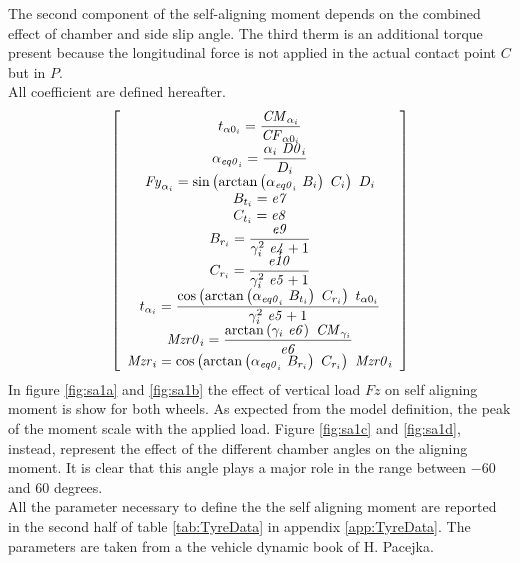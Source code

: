 The second component of the self-aligning moment depends on the combined effect of chamber and side slip angle. The third therm is an additional torque present because the longitudinal force is not applied in the actual contact point $C$ but in $P$.\cite{pacejka2012tire} \\
All coefficient are defined hereafter.
%
%
%
\begin{equation}
    \left[ \begin{array}{c} 
    \displaystyle t_{\alpha0_{i}} =\frac{{\it CM}_{\alpha_{i}}
    }{{\it CF}_{\alpha0_{i}} }\\ \displaystyle \alpha_{{\it eq0}_{i}}
    =\frac{\alpha_{i} ~{\it D0}_{i} }{D_{i} }\\ {\it Fy
   }_{\alpha_{i}} =\sin \left(\arctan \left(\alpha_{{\it eq0}_{i}} ~B_{i}
    \right)~C_{i} \right)~D_{i} \\ B_{t_{i}} ={\it e7} 
   \\ C_{t_{i}} ={\it e8} \\ \displaystyle B_{r_{i}
   } =\frac{{\it e9} }{\gamma_{i} ^{2}~{\it e4} +1}\\ \displaystyle C
   _{r_{i}} =\frac{{\it e10} }{\gamma_{i} ^{2}~{\it e5} +1}
   \\ \displaystyle t_{\alpha_{i}} =\frac{\cos \left(\arctan \left(
   \alpha_{{\it eq0}_{i}} ~B_{t_{i}} \right)~C_{r_{i}} \right)~t_{\alpha0
   _{i}} }{\gamma_{i} ^{2}~{\it e5} +1}\\ \displaystyle {\it Mzr0}_{i
   } =\frac{\arctan \left(\gamma_{i} ~{\it e6} \right)~{\it CM}_{\gamma_{
   i}} }{{\it e6} }\\ {\it Mzr}_{i} =\cos \left(
   \arctan \left(\alpha_{{\it eq0}_{i}} ~B_{r_{i}} \right)~C_{r_{i}} 
   \right)~{\it Mzr0}_{i} 
    \end{array} \right]    
\end{equation}
%
In figure \ref{fig:sa1a} and \ref{fig:sa1b} the effect of vertical load $Fz$ on self aligning moment is show for both wheels. As expected from the model definition, the peak of the moment scale with the applied load. Figure \ref{fig:sa1c} and \ref{fig:sa1d}, instead, represent the effect of the different chamber angles on the aligning moment. It is clear that this angle plays a major role in the range between $-60$ and $60$ degrees.\\
All the parameter necessary to define the the self aligning moment are reported in the second half of table \ref{tab:TyreData} in appendix \ref{app:TyreData}. The parameters are taken from a the vehicle dynamic book of H. Pacejka.\cite{pacejka2012tire}\\
%
